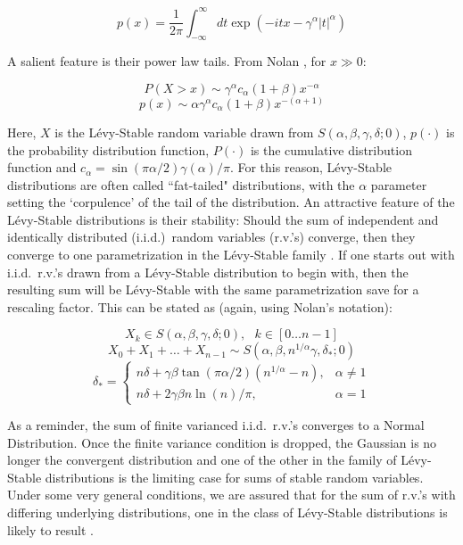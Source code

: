 \documentclass[twoside,11pt]{article}
\begin{document}
$$ p(x) = \frac{1}{2 \pi} \int_{-\infty}^{\infty} dt \exp( - i t x - \gamma^\alpha | t |^\alpha ) $$

A salient feature is their power law tails.  From Nolan \cite{nolan}, for $x \gg 0$:

$$ P( X > x ) \sim \gamma^{\alpha} c_{\alpha} (1 + \beta) x^{-\alpha} $$
$$ p( x ) \sim \alpha \gamma^{\alpha} c_{\alpha} (1 + \beta) x^{ - (\alpha + 1) } $$

Here, $X$ is the L\'evy-Stable random variable drawn from $S(\alpha, \beta, \gamma, \delta; 0)$,
$p(\cdot)$ is the probability distribution function, $P(\cdot)$ is the cumulative distribution
function and $ c_{\alpha} = \sin( \pi \alpha / 2 ) \gamma(\alpha) / \pi $.
For this reason, L\'evy-Stable distributions are often called ``fat-tailed" distributions, with
the $\alpha$ parameter setting the `corpulence' of the tail of the distribution.
An attractive feature of
the L\'evy-Stable distributions is their stability:
Should the sum of independent and identically distributed (i.i.d.)\ random variables (r.v.'s) converge,
then they converge to one parametrization in the L\'evy-Stable family
\cite{nolan,feller,zolotarev}.
If one starts out with i.i.d.\ r.v.'s drawn from a L\'evy-Stable distribution to begin with, then the resulting sum
will be L\'evy-Stable with the same parametrization save for a rescaling factor.
This can be stated as (again, using Nolan's \citeyear{nolan} notation):

$$ X_k \in S(\alpha, \beta, \gamma, \delta; 0), \ \ \ k \in [0 \dots n-1 ]$$
$$ X_0 + X_1 + \dots + X_{n-1} \sim S(\alpha, \beta, n^{1 / \alpha} \gamma, \delta_*; 0) $$
$$ \delta_* = 
\left\{
  \begin{array}{ll}
      n \delta + \gamma \beta \tan( \pi \alpha / 2) (n^{1/\alpha} - n ), & \alpha \ne 1 \\
      n \delta + 2 \gamma \beta n \ln(n)  / \pi , & \alpha = 1 
  \end{array}
\right.
$$

As a reminder, the sum of finite varianced i.i.d.\ r.v.'s
converges to a Normal Distribution.
Once the finite variance
condition is dropped, the Gaussian is no longer the convergent distribution
and one of the other in the family of L\'evy-Stable distributions %
is the limiting case for sums of stable random variables.
Under some very general conditions, we are assured
that for the sum of r.v.'s with differing underlying distributions,
one in the class of L\'evy-Stable distributions is likely
to result \cite{feller}.
\end{document}
